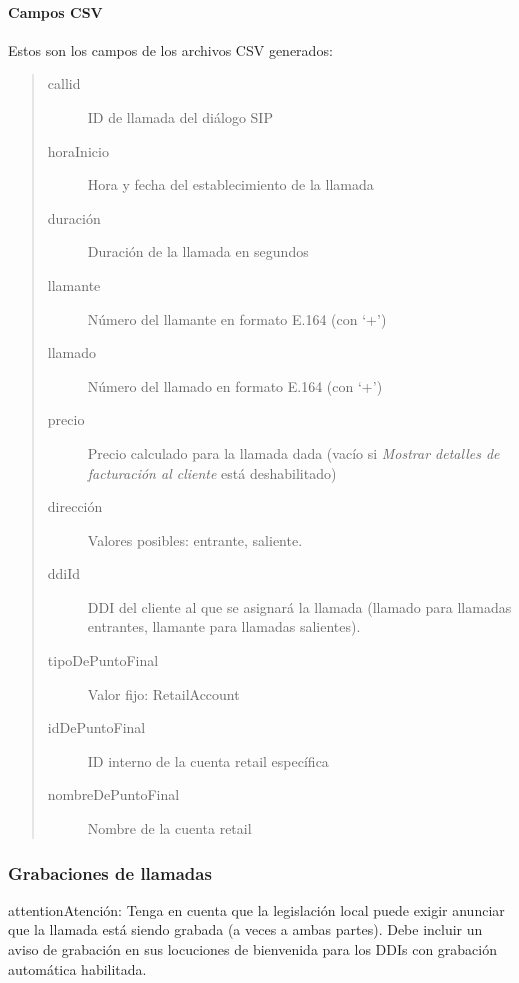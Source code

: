 \documentclass[letterpaper,10pt,spanish]{sphinxmanual}
\begin{document}
\paragraph{Campos CSV}
\label{administration_portal/client/retail/calls/call_csv_schedulers:csv-fields}
Estos son los campos de los archivos CSV generados:
\begin{quote}
\begin{description}
\item[{callid}] \leavevmode
ID de llamada del diálogo SIP

\item[{horaInicio}] \leavevmode
Hora y fecha del establecimiento de la llamada

\item[{duración}] \leavevmode
Duración de la llamada en segundos

\item[{llamante}] \leavevmode
Número del llamante en formato E.164 (con `+')

\item[{llamado}] \leavevmode
Número del llamado en formato E.164 (con `+')

\item[{precio}] \leavevmode
Precio calculado para la llamada dada (vacío si \emph{Mostrar detalles de facturación al cliente} está deshabilitado)

\item[{dirección}] \leavevmode
Valores posibles: entrante, saliente.

\item[{ddiId}] \leavevmode
DDI del cliente al que se asignará la llamada (llamado para llamadas entrantes, llamante para llamadas salientes).

\item[{tipoDePuntoFinal}] \leavevmode
Valor fijo: RetailAccount

\item[{idDePuntoFinal}] \leavevmode
ID interno de la cuenta retail específica

\item[{nombreDePuntoFinal}] \leavevmode
Nombre de la cuenta retail

\end{description}
\end{quote}


\subsubsection{Grabaciones de llamadas}
\label{administration_portal/client/retail/calls/call_recordings::doc}\label{administration_portal/client/retail/calls/call_recordings:call-recordings}
\begin{notice}{attention}{Atención:}
Tenga en cuenta que la legislación local puede exigir anunciar que la llamada está siendo grabada (a veces a ambas partes). Debe incluir un aviso de grabación en sus locuciones de bienvenida para los DDIs con grabación automática habilitada.
\end{notice}
\end{document}
